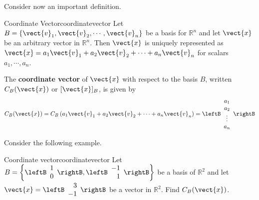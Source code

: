 Consider now an important definition.

\begin{definition}{Coordinate Vector}{coordinatevector}
Let $B = \left\{ \vect{v}_1, \vect{v}_2, \cdots, \vect{v}_n \right\}$
be a basis for $\mathbb{R}^n$ and let $\vect{x}$ be an arbitrary
vector in $\mathbb{R}^n$. Then $\vect{x}$ is uniquely represented as
$\vect{x} = a_1\vect{v}_1 +
a_2\vect{v}_2 + \cdots + a_n\vect{v}_n$ for scalars $a_1, \cdots,
a_n$. 

The  \textbf{coordinate vector} of $\vect{x}$ with respect to the
basis $B$, written $C_B(\vect{x})$ or  $[\vect{x}]_B$,  is given by
\[
C_B(\vect{x}) =  C_B \left( a_1\vect{v}_1 + a_2\vect{v}_2 + \cdots + a_n\vect{v}_n \right) = \leftB
\begin{array}{c}
a_1 \\
a_2 \\
\vdots \\
a_n
\end{array} \rightB
\] 
\end{definition}

Consider the following example.

\begin{example}{Coordinate vector}{coordinatevector}
Let $B = \left\{ \leftB \begin{array}{r}
1 \\
0 
\end{array} \rightB, \leftB \begin{array}{r}
-1 \\
1
\end{array} \rightB \right\}$ be a basis of $\mathbb{R}^2$ and let $\vect{x} = \leftB
\begin{array}{r}
3 \\
-1
\end{array}
\rightB$ be a vector in $\mathbb{R}^2$. Find $C_B(\vect{x})$. 
\end{example}

